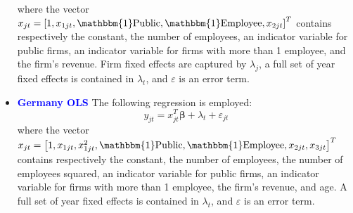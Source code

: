 \documentclass[12pt,notitlepage]{article}
\newcommand{\sym}[1] {\ifmmode^{#1} \else\(^{#1}\) \fi}
\begin{document}
\begin{itemize}
\begin{equation}
	\end{equation}
where the vector $x_{jt} = \left[  1, x_{1jt}, \mathbbm{1}\text{Public}, \mathbbm{1}\text{Employee}, x_{2jt} \right]^{T} $ contains respectively the constant, the number of employees, an indicator variable for public firms, an indicator variable for firms with more than 1 employee, and the firm's revenue. Firm fixed effects are captured by $\lambda_{j}$, a full set of year fixed effects is contained in $\lambda_{t}$, and $\varepsilon$ is an error term.
\begin{table}[htbp]\centering
\def\sym#1{\ifmmode^{#1}\else\(^{#1}\)\fi}
\caption{Haltiwanger growth rate}
\end{table}
\clearpage




\item \textcolor{blue}{\textbf{Germany OLS}}
The following regression is employed:
	\begin{equation}
	y_{jt} = x^{T}_{jt}\mathbf{\beta} + \lambda_{t} + \varepsilon_{jt}
	\end{equation}
where the vector $x_{jt} = \left[  1, x_{1jt}, x^{2}_{1jt}, \mathbbm{1}\text{Public}, \mathbbm{1}\text{Employee}, x_{2jt}, x_{3jt}  \right]^{T} $ contains respectively the constant, the number of employees, the number of employees squared, an indicator variable for public firms, an indicator variable for firms with more than 1 employee, the firm's revenue, and age. A full set of year fixed effects is contained in $\lambda_{t}$, and $\varepsilon$ is an error term.
\begin{table}[htbp]\centering
\def\sym#1{\ifmmode^{#1}\else\(^{#1}\)\fi}
\caption{Haltiwanger growth rate}
\end{table}
\clearpage


\end{itemize}
\end{document}
